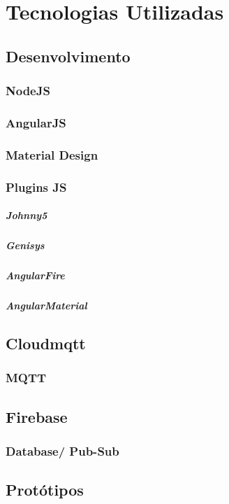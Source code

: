 \chapter{Tecnologias Utilizadas}
\section{Desenvolvimento}
	\subsection{NodeJS}
	\subsection{AngularJS}
	\subsection{Material Design}
	\subsection{Plugins JS}
		\paragraph{Johnny5} 
		\paragraph{Genisys}
		\paragraph{AngularFire}
		\paragraph{AngularMaterial}
	\section{Cloudmqtt}
		\subsection{MQTT}
	\section{Firebase}
		\subsection{Database/ Pub-Sub}
	\section{Prot\'otipos}
